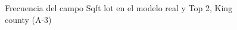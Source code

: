 \begin{figure}[H]
    \centering
    
    \caption{Frecuencia del campo Sqft lot en el modelo real y Top 2, King county (A-3)}
    \label{frecuency-top2-sqft lot}
\end{figure}